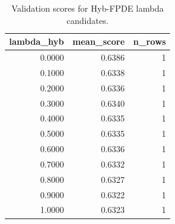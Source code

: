 \begin{table}[t]
\caption{Validation scores for Hyb-FPDE lambda candidates.}
\label{tab:lambda_distribution_computed}
\centering
\begin{tabular}{rrr}
\toprule
lambda\_hyb & mean\_score & n\_rows \\
\midrule
0.0000 & 0.6386 & 1 \\
0.1000 & 0.6338 & 1 \\
0.2000 & 0.6336 & 1 \\
0.3000 & 0.6340 & 1 \\
0.4000 & 0.6335 & 1 \\
0.5000 & 0.6335 & 1 \\
0.6000 & 0.6336 & 1 \\
0.7000 & 0.6332 & 1 \\
0.8000 & 0.6327 & 1 \\
0.9000 & 0.6322 & 1 \\
1.0000 & 0.6323 & 1 \\
\bottomrule
\end{tabular}

\end{table}
